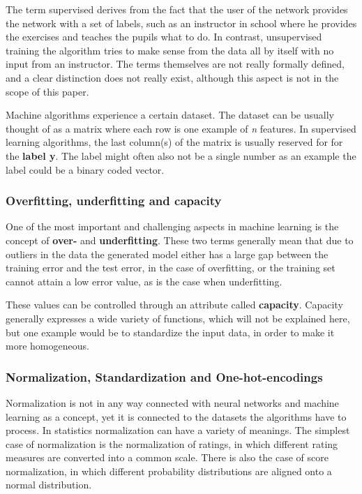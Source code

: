 \documentclass[12pt]{article}
\begin{document}
The term supervised derives from the fact that the user of the network provides the network with a set of labels, such as an instructor in school where he provides the exercises and teaches the pupils what to do. In contrast, unsupervised training the algorithm tries to make sense from the data all by itself with no input from an instructor. The terms themselves are not really formally defined, and a clear distinction does not really exist, although this aspect is not in the scope of this paper.

Machine algorithms experience a certain dataset. The dataset can be usually thought of as a matrix where each row is one example of \textit{n} features. In supervised learning algorithms, the last column(s) of the matrix is usually reserved for for the \textbf{label y}. The label might often also not be a single number as an example the label could be a binary coded vector.
\subsubsection{Overfitting, underfitting and capacity}
\label{subsub:overfitting}

One of the most important and challenging aspects in machine learning is the concept of \textbf{over-} and \textbf{underfitting}. These two terms generally mean that due to outliers in the data the generated model either has a large gap between the training error and the test error, in the case of overfitting, or the training set cannot attain a low error value, as is the case when underfitting. 

These values can be controlled through an attribute called \textbf{capacity}. Capacity generally expresses a wide variety of functions, which will not be explained here, but one example would be to standardize the input data, in order to make it more homogeneous.

\subsubsection{Normalization, Standardization and One-hot-encodings}
\label{subsub:norm_stand_one_hot}

Normalization is not in any way connected with neural networks and machine learning as a concept, yet it is connected to the datasets the algorithms have to process. In statistics normalization can have a variety of meanings. The simplest case of normalization is the normalization of ratings, in which different rating measures are converted into a common scale. There is also the case of score normalization, in which different probability distributions are aligned onto a normal distribution.
\end{document}
